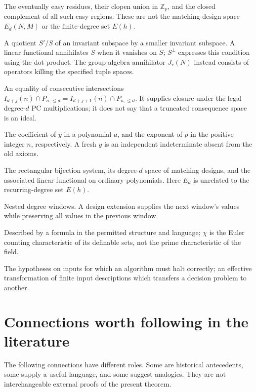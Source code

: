 \begin{description}[style=nextline,leftmargin=1em,labelindent=0pt,labelwidth=0pt]
\item[$A_d(h),\mathcal E_d(h),\mathcal H_p(h)$] The eventually easy
residues, their clopen union in $\mathbb Z_p$, and the closed complement
of all such easy regions. These are not the matching-design space
$E_d(N,M)$ or the finite-degree set $E(h)$.
\item[Subquotient; annihilator] A quotient $S'/S$ of an invariant
subspace by a smaller invariant subspace. A linear functional
annihilates $S$ when it vanishes on $S$; $S^\perp$ expresses this
condition using the dot product. The group-algebra annihilator $J_r(N)$
instead consists of operators killing the specified tuple spaces.
\item[Plateau] An equality of consecutive intersections
$I_{d+j}(n)\cap P_{n,\le d}=I_{d+j+1}(n)\cap P_{n,\le d}$.
It supplies closure under the legal degree-$d$ PC multiplications;
it does not say that a truncated consequence space is an ideal.
\item[{$[y^1]a, v_p(n)$}] The coefficient of $y$ in a polynomial $a$,
and the exponent of $p$ in the positive integer $n$, respectively.
A fresh $y$ is an independent indeterminate absent from the old axioms.
\item[$B_{r,m},E_d(N,M),\Lambda_\psi$] The rectangular bijection
system, its degree-$d$ space of matching designs, and the associated
linear functional on ordinary polynomials. Here $E_d$ is unrelated
to the recurring-degree set $E(h)$.
\item[Filtration; extension] Nested degree windows. A design extension
supplies the next window's values while preserving all values in the
previous window.
\item[Definable; $\chi$] Described by a formula in the permitted
structure and language; $\chi$ is the Euler counting characteristic
of its definable sets, not the prime characteristic of the field.
\item[Promise; reduction] The hypotheses on inputs for which an
algorithm must halt correctly; an effective transformation of finite
input descriptions which transfers a decision problem to another.
\end{description}


\section{Connections worth following in the literature}
\label{tx:sec:literature-route}
The following connections have different roles. Some are historical
antecedents, some supply a useful language, and some suggest analogies.
They are not interchangeable external proofs of the present theorem.

